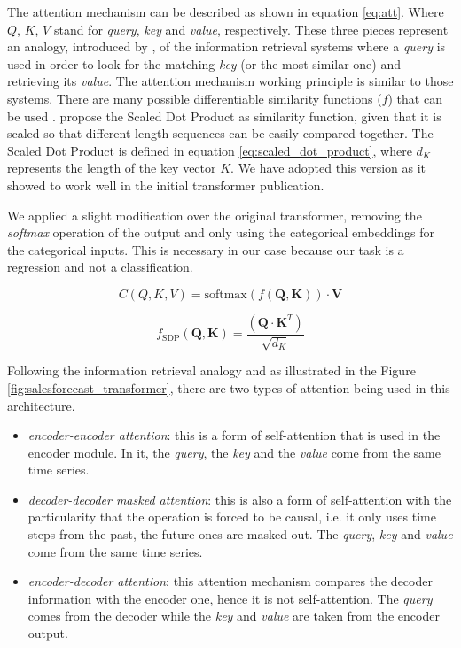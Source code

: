 The attention mechanism can be described as shown in equation \ref{eq:att}. Where $Q$, $K$, $V$ stand for \textit{query}, \textit{key} and \textit{value}, respectively. These three pieces represent an analogy, introduced by \autocite{vaswani2017}, of the information retrieval systems where a \textit{query} is used in order to look for the matching \textit{key} (or the most similar one) and retrieving its \textit{value}. The attention mechanism working principle is similar to those systems. There are many possible differentiable similarity functions ($f$) that can be used \autocite{uday2019}. \autocite{vaswani2017} propose the Scaled Dot Product as similarity function, given that it is scaled so that different length sequences can be easily compared together. The Scaled Dot Product is defined in equation \ref{eq:scaled_dot_product},  where $d_K$ represents the length of the key vector $K$. We have adopted this version as it showed to work well in the initial transformer publication.

We applied a slight modification over the original transformer, removing the \textit{softmax} operation of the output and only using the categorical embeddings for the categorical inputs. This is necessary in our case because our task is a regression and not a classification.

\begin{equation}
C(Q,K,V) = \text{softmax}(f(\mathbf{Q}, \mathbf{K})) \cdot \mathbf{V}
\label{eq:att}
\end{equation}

\begin{equation}
f_{\text{SDP}}(\mathbf{Q}, \mathbf{K}) = \frac{(\mathbf{Q} \cdot \mathbf{K}^T)} {\sqrt {d_K}}
\label{eq:scaled_dot_product}
\end{equation}

Following the information retrieval analogy and as illustrated in the Figure \ref{fig:salesforecast_transformer}, there are two types of attention being used in this architecture.
\begin{itemize}
	\item \textit{encoder-encoder attention}: this is a form of self-attention that is used in the encoder module. In it, the \textit{query}, the \textit{key} and the \textit{value} come from the same time series.
	\item \textit{decoder-decoder masked attention}: this is also a form of self-attention with the particularity that the operation is forced to be causal, i.e. it only uses time steps from the past, the future ones are masked out. The \textit{query}, \textit{key} and \textit{value} come from the same time series.
	\item \textit{encoder-decoder attention}: this attention mechanism compares the decoder information with the encoder one, hence it is not self-attention. The \textit{query} comes from the decoder while the \textit{key} and \textit{value} are taken from the encoder output.
\end{itemize}

